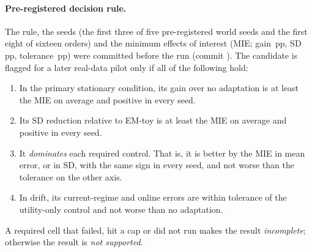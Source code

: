 \paragraph{Pre-registered decision rule.} The rule, the seeds (the first three of five pre-registered world
seeds and the first eight of sixteen orders) and the minimum effects of interest (MIE; gain
\,pp, SD \,pp, tolerance \,pp) were committed before the run (commit
\texttt{}). The candidate is flagged for a later real-data pilot only if all of the following
hold:
\begin{enumerate}
\item In the primary stationary condition, its gain over no adaptation is at least the MIE on average and
positive in every seed.
\item Its SD reduction relative to EM-toy is at least the MIE on average and positive in every seed.
\item It \emph{dominates} each required control. That is, it is better by the MIE in mean error, or in SD,
with the same sign in every seed, and not worse than the tolerance on the other axis.
\item In drift, its current-regime and online errors are within tolerance of the utility-only control and
not worse than no adaptation.
\end{enumerate}
A required cell that failed, hit a cap or did not run makes the result \emph{incomplete}; otherwise the result
is \emph{not supported}.
